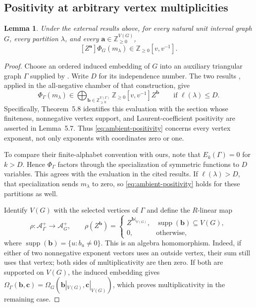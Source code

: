 \documentclass[11pt]{article}
\newtheorem{lemma}[theorem]{Lemma}
\theoremstyle{remark}
\newcommand{\NN}{\mathbb Z_{\geq 0}}
\newcommand{\avec}{\mathbf a}
\newcommand{\bvec}{\mathbf b}
\newcommand{\cvec}{\mathbf c}
\newcommand{\cA}{\mathcal A}
\DeclareMathOperator{\supp}{supp}
\numberwithin{equation}{section}
\begin{document}
\subsection{Positivity at arbitrary vertex multiplicities}
\begin{lemma}\label{lem:positivity}
Under the external results above, for every natural unit interval graph
$G$, every partition $\lambda$, and every $\avec\in\NN^{V(G)}$,
\begin{equation}\label{eq:positive-coefficient}
 [Z^{\avec}]\Phi_G(m_\lambda)\in\NN[v,v^{-1}].
\end{equation}
\end{lemma}
\begin{proof}
Choose an ordered induced embedding of $G$ into an auxiliary triangular
graph $\Gamma$ supplied by \cite[Lemma~5.1]{OAI}. Write $D$ for its
independence number. The two results
\cite[Lemma~5.7 and Theorem~5.8]{OAI}, applied in the all-negative chamber
of that construction, give
\begin{equation}\label{eq:ambient-positivity}
 \Phi_\Gamma(m_\lambda)
       \in\bigoplus_{\bvec\in\NN^{V(\Gamma)}}
                       \NN[v,v^{-1}]Z^{\bvec}
       \qquad\text{if }\ell(\lambda)\leq D.
\end{equation}
Specifically, Theorem~5.8 identifies this evaluation with the section
whose finiteness, nonnegative vertex support, and Laurent-coefficient
positivity are asserted in Lemma~5.7. Thus \eqref{eq:ambient-positivity}
concerns every vertex exponent, not only exponents with coordinates
zero or one.

To compare their finite-alphabet convention with ours, note that
$E_k(\Gamma)=0$ for $k>D$. Hence $\Phi_\Gamma$ factors through the
specialization of symmetric functions to $D$ variables. This agrees with
the evaluation in the cited results. If $\ell(\lambda)>D$, that
specialization sends $m_\lambda$ to zero, so
\eqref{eq:ambient-positivity} holds for these partitions as well.

Identify $V(G)$ with the selected vertices of $\Gamma$ and define the
$R$-linear map
\begin{equation}\label{eq:projection}
 \rho:\cA_\Gamma^+\longrightarrow\cA_G^+,
 \qquad
 \rho(Z^{\bvec})=
 \begin{cases}
  Z^{\bvec|_{V(G)}},&\supp(\bvec)\subseteq V(G),\\
  0,&\text{otherwise},
 \end{cases}
\end{equation}
where $\supp(\bvec)=\{u:b_u\ne0\}$.
This is an algebra homomorphism. Indeed, if either of two nonnegative
exponent vectors uses an outside vertex, their sum still uses that
vertex; both sides of multiplicativity are then zero. If both are
supported on $V(G)$, the induced embedding gives
$\Omega_\Gamma(\bvec,\cvec)=
 \Omega_G(\bvec|_{V(G)},\cvec|_{V(G)})$, which proves multiplicativity
in the remaining case.


\end{proof}
\end{document}
